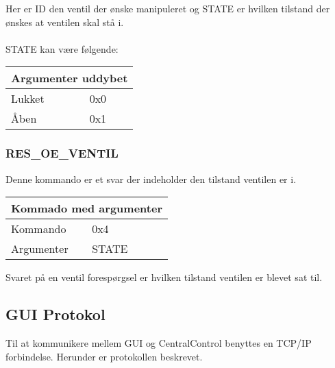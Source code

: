 Her er ID den ventil der ønske manipuleret og STATE er hvilken tilstand der ønskes at ventilen skal stå i.\\\\
STATE kan være følgende:
\begin{table}[H]
\setlength{\parindent}{12pt}
\begin{tabular}{|l|l|}
\hline
\multicolumn{2}{|c|}{Argumenter uddybet}\\\hline
Lukket & 0x0 \\
Åben & 0x1 \\\hline
\end{tabular}
\end{table}

\subsubsection{RES\_OE\_VENTIL}
Denne kommando er et svar der indeholder den tilstand ventilen er i.

\begin{table}[H]
\setlength{\parindent}{12pt}
\begin{tabular}{|l|lcc|}
\hline
\multicolumn{4}{|c|}{Kommado med argumenter}\\\hline
Kommando & 0x4 & & \\
Argumenter & STATE & & \\\hline
\end{tabular}
\end{table}

Svaret på en ventil forespørgsel er hvilken tilstand ventilen er blevet sat til.


\subsection{GUI Protokol}

Til at kommunikere mellem GUI og CentralControl benyttes en TCP/IP forbindelse. Herunder er protokollen beskrevet.\\\\

